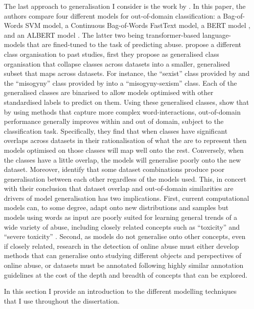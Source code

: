 The last approach to generalisation I consider is the work by \citet{Fortuna:2021}. In this paper, the authors compare four different models for out-of-domain classification: a Bag-of-Words SVM model, a Continuous Bag-of-Words FastText model, a BERT model \citep{Devlin:2019}, and an ALBERT model \cite{Lan:2020}. The latter two being transformer-based language-models that are fined-tuned to the task of predicting abuse.
\citet{Fortuna:2021} propose a different class organisation to past studies, first they propose as generalised class organisation that collapse classes across datasets into a smaller, generalised subset that maps across datasets. For instance, the ``sexist'' class provided by \citet{Waseem-Hovy:2016} and the ``misogyny'' class provided by \citet{Fersini:2018} into a ``misogyny-sexism'' class. Each of the generalised classes are binarised to allow models optimised with other standardised labels to predict on them.
Using these generalised classes, \citet{Fortuna:2021} show that by using methods that capture more complex word-interactions, out-of-domain performance generally improves within and out of domain, subject to the classification task.
Specifically, they find that when classes have significant overlaps across datasets in their rationalisation of what the are to represent then models optimised on those classes will map well onto the rest.
Conversely, when the classes have a little overlap, the models will generalise poorly onto the new dataset.
Moreover, \citet{Fortuna:2021} identify that some dataset combinations produce poor generalisation between each other regardless of the models used.
This, in concert with their conclusion that dataset overlap and out-of-domain similarities are drivers of model generalisation has two implications.
First, current computational models can, to some degree, adapt onto new distributions and samples but models using words as input are poorly suited for learning general trends of a wide variety of abuse, including closely related concepts such as ``toxicity'' and ``severe toxicity'' \citep{Fortuna:2021}.
Second, as models do not generalise onto other concepts, even if closely related, research in the detection of online abuse must either develop methods that can generalise onto studying different objects and perspectives of online abuse, or datasets must be annotated following highly similar annotation guidelines at the cost of the depth and breadth of concepts that can be explored.

\label{sec:model_background}
In this section I provide an introduction to the different modelling techniques that I use throughout the dissertation.

